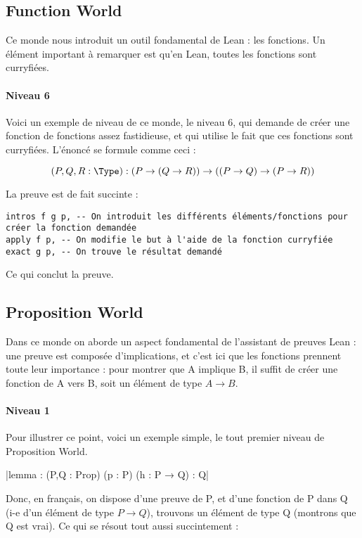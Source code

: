 
\subsection{Function World}
Ce monde nous introduit un outil fondamental de Lean : les fonctions. 
Un élément important à remarquer est qu'en Lean, toutes les fonctions sont curryfiées.


\paragraph{Niveau 6}
Voici un exemple de niveau de ce monde, le niveau 6, qui demande de créer une fonction de fonctions assez fastidieuse, et qui utilise le fait que ces fonctions sont curryfiées. 
L'énoncé se formule comme ceci : 

\begin{equation*}
        (P, Q, R : \Type) : (P \to (Q \to R)) \to ((P \to Q) \to (P \to R))
\end{equation*}

La preuve est de fait succinte : 
\begin{verbatim}
intros f g p, -- On introduit les différents éléments/fonctions pour créer la fonction demandée 
apply f p, -- On modifie le but à l'aide de la fonction curryfiée 
exact g p, -- On trouve le résultat demandé 
\end{verbatim}
Ce qui conclut la preuve.

\subsection{Proposition World}
Dans ce monde on aborde un aspect fondamental de l'assistant de preuves Lean : une preuve est composée d'implications, et c'est ici que les fonctions prennent toute leur importance : pour montrer que A implique B, il suffit de créer une fonction de A vers B, soit un élément de type $A \to B$.
\paragraph{Niveau 1}
Pour illustrer ce point, voici un exemple simple, le tout premier niveau de Proposition World. 

|lemma : (P,Q : Prop) (p : P) (h : P → Q) : Q|

Donc, en français, on dispose d'une preuve de P, et d'une fonction de P dans Q (i-e d'un élément de type $P \to Q$), trouvons un élément de type Q (montrons que Q est vrai). 
Ce qui se résout tout aussi succintement : 

